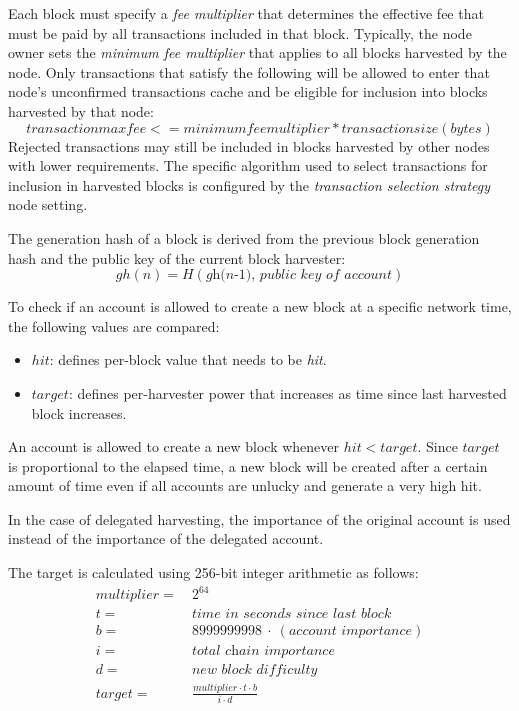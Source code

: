 
Each block must specify a \textit{fee multiplier} that determines the effective fee that must be paid by all transactions included in that block.
Typically, the node owner sets the \textit{minimum fee multiplier} that applies to all blocks harvested by the node.
Only transactions that satisfy the following will be allowed to enter that node's unconfirmed transactions cache and be eligible for inclusion into blocks harvested by that node:
$$transaction max fee <= minimum fee multiplier * transaction size (bytes)$$
Rejected transactions may still be included in blocks harvested by other nodes with lower requirements.
The specific algorithm used to select transactions for inclusion in harvested blocks is configured by the \textit{transaction selection strategy} node setting.


The generation hash of a block is derived from the previous block generation hash and the public key of the current block harvester:
\begin{equation}
\tag{generation hash} \mathit{gh(n)} = H(\textit{gh(n-1), public key of account})
\end{equation}

To check if an account is allowed to create a new block at a specific network time, the following values are compared:
\begin{itemize}
\item{ $hit$: defines per-block value that needs to be \textit{hit}.}
\item{ $target$: defines per-harvester power that increases as time since last harvested block increases.}
\end{itemize}
An account is allowed to create a new block whenever $\mathit{hit} < \mathit{target}$.
Since $\mathit{target}$ is proportional to the elapsed time, a new block will be created after a certain amount of time even if all accounts are unlucky and generate a very high hit.

In the case of delegated harvesting, the importance of the original account is used instead of the importance of the delegated account.

The target is calculated using 256-bit integer arithmetic as follows:
\begin{align*}
multiplier = \: & 2^{64} \\
t = \: & \textit{time in seconds since last block} \\
b = \: & 8999999998 \: \cdot \: (\textit{account importance}) \\
i = \: & \textit{total chain importance} \\
d = \: & \textit{new block difficulty} \\
target = \: & \frac{multiplier \cdot t \cdot b}{i \cdot d}
\end{align*}


